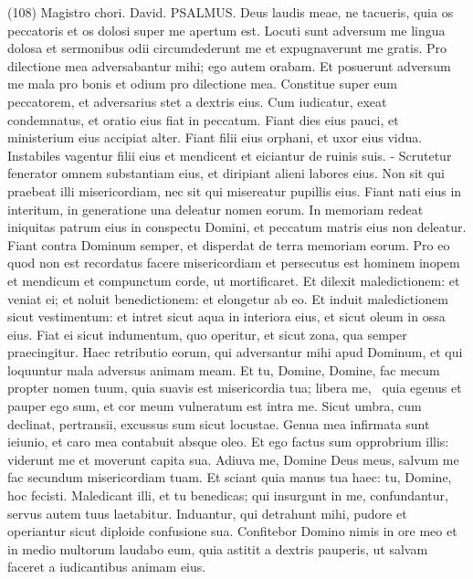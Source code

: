\begin{biblechapter}  (108) 
\verse  Magistro chori. David. PSALMUS. Deus laudis meae, ne tacueris, 
\verse quia os peccatoris et os dolosi super me apertum est. Locuti sunt adversum me lingua dolosa 
\verse et sermonibus odii circumdederunt me et expugnaverunt me gratis. 
\verse Pro dilectione mea adversabantur mihi; ego autem orabam. 
\verse Et posuerunt adversum me mala pro bonis et odium pro dilectione mea. 
\verse Constitue super eum peccatorem, et adversarius stet a dextris eius. 
\verse Cum iudicatur, exeat condemnatus, et oratio eius fiat in peccatum. 
\verse Fiant dies eius pauci, et ministerium eius accipiat alter. 
\verse Fiant filii eius orphani, et uxor eius vidua. 
\verse Instabiles vagentur filii eius et mendicent et eiciantur de ruinis suis. - 
\verse Scrutetur fenerator omnem substantiam eius, et diripiant alieni labores eius. 
\verse Non sit qui praebeat illi misericordiam, nec sit qui misereatur pupillis eius. 
\verse Fiant nati eius in interitum, in generatione una deleatur nomen eorum. 
\verse In memoriam redeat iniquitas patrum eius in conspectu Domini, et peccatum matris eius non deleatur. 
\verse Fiant contra Dominum semper, et disperdat de terra memoriam eorum. 
\verse Pro eo quod non est recordatus facere misericordiam et persecutus est hominem inopem et mendicum et compunctum corde, ut mortificaret. 
\verse Et dilexit maledictionem: et veniat ei; et noluit benedictionem: et elongetur ab eo. 
\verse Et induit maledictionem sicut vestimentum: et intret sicut aqua in interiora eius, et sicut oleum in ossa eius. 
\verse Fiat ei sicut indumentum, quo operitur, et sicut zona, qua semper praecingitur. 
\verse Haec retributio eorum, qui adversantur mihi apud Dominum, et qui loquuntur mala adversus animam meam. 
\verse Et tu, Domine, Domine, fac mecum propter nomen tuum, quia suavis est misericordia tua; libera me,  
\verse quia egenus et pauper ego sum, et cor meum vulneratum est intra me. 
\verse Sicut umbra, cum declinat, pertransii, excussus sum sicut locustae. 
\verse Genua mea infirmata sunt ieiunio, et caro mea contabuit absque oleo. 
\verse Et ego factus sum opprobrium illis: viderunt me et moverunt capita sua. 
\verse Adiuva me, Domine Deus meus, salvum me fac secundum misericordiam tuam. 
\verse Et sciant quia manus tua haec: tu, Domine, hoc fecisti. 
\verse Maledicant illi, et tu benedicas; qui insurgunt in me, confundantur, servus autem tuus laetabitur. 
\verse Induantur, qui detrahunt mihi, pudore et operiantur sicut diploide confusione sua. 
\verse Confitebor Domino nimis in ore meo et in medio multorum laudabo eum, 
\verse quia astitit a dextris pauperis, ut salvam faceret a iudicantibus animam eius. 
\end{biblechapter}

